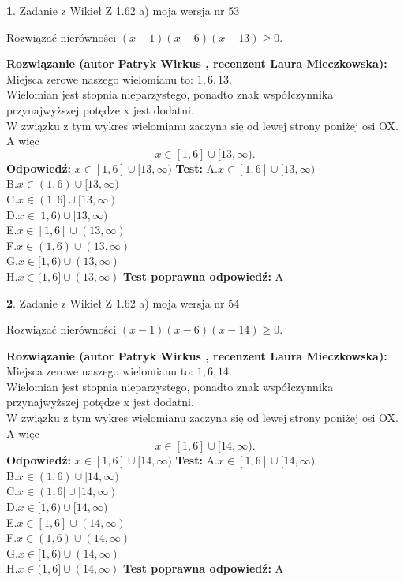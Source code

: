 \documentclass[12pt, a4paper]{article}
\theoremstyle{definition} %
\newtheorem{zad}{}
\newcommand{\zadStart}[1]{\begin{zad}#1\newline}
\newcommand{\zadStop}{\end{zad}}
\newcommand{\rozwStart}[2]{\noindent \textbf{Rozwiązanie (autor #1 , recenzent #2): }\newline}
\newcommand{\rozwStop}{\newline}
\newcommand{\odpStart}{\noindent \textbf{Odpowiedź:}\newline}
\newcommand{\odpStop}{\newline}
\newcommand{\testStart}{\noindent \textbf{Test:}\newline}
\newcommand{\testStop}{\newline}
\newcommand{\kluczStart}{\noindent \textbf{Test poprawna odpowiedź:}\newline}
\newcommand{\kluczStop}{\newline}
\begin{document}
\zadStart{Zadanie z Wikieł Z 1.62 a) moja wersja nr 53}

Rozwiązać nierówności $(x-1)(x-6)(x-13)\ge0$.
\zadStop
\rozwStart{Patryk Wirkus}{Laura Mieczkowska}
Miejsca zerowe naszego wielomianu to: $1, 6, 13$.\\
Wielomian jest stopnia nieparzystego, ponadto znak współczynnika przy\linebreak najwyższej potędze x jest dodatni.\\ W związku z tym wykres wielomianu zaczyna się od lewej strony poniżej osi OX. A więc $$x \in [1,6] \cup [13,\infty).$$
\rozwStop
\odpStart
$x \in [1,6] \cup [13,\infty)$
\odpStop
\testStart
A.$x \in [1,6] \cup [13,\infty)$\\
B.$x \in (1,6) \cup [13,\infty)$\\
C.$x \in (1,6] \cup [13,\infty)$\\
D.$x \in [1,6) \cup [13,\infty)$\\
E.$x \in [1,6] \cup (13,\infty)$\\
F.$x \in (1,6) \cup (13,\infty)$\\
G.$x \in [1,6) \cup (13,\infty)$\\
H.$x \in (1,6] \cup (13,\infty)$
\testStop
\kluczStart
A
\kluczStop



\zadStart{Zadanie z Wikieł Z 1.62 a) moja wersja nr 54}

Rozwiązać nierówności $(x-1)(x-6)(x-14)\ge0$.
\zadStop
\rozwStart{Patryk Wirkus}{Laura Mieczkowska}
Miejsca zerowe naszego wielomianu to: $1, 6, 14$.\\
Wielomian jest stopnia nieparzystego, ponadto znak współczynnika przy\linebreak najwyższej potędze x jest dodatni.\\ W związku z tym wykres wielomianu zaczyna się od lewej strony poniżej osi OX. A więc $$x \in [1,6] \cup [14,\infty).$$
\rozwStop
\odpStart
$x \in [1,6] \cup [14,\infty)$
\odpStop
\testStart
A.$x \in [1,6] \cup [14,\infty)$\\
B.$x \in (1,6) \cup [14,\infty)$\\
C.$x \in (1,6] \cup [14,\infty)$\\
D.$x \in [1,6) \cup [14,\infty)$\\
E.$x \in [1,6] \cup (14,\infty)$\\
F.$x \in (1,6) \cup (14,\infty)$\\
G.$x \in [1,6) \cup (14,\infty)$\\
H.$x \in (1,6] \cup (14,\infty)$
\testStop
\kluczStart
A
\kluczStop
\end{document}
